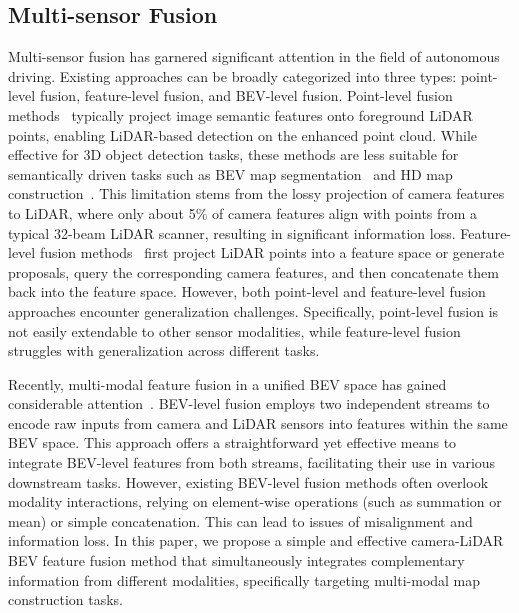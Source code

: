 \subsection{Multi-sensor Fusion}
Multi-sensor fusion has garnered significant attention in the field of autonomous driving. Existing approaches can be broadly categorized into three types: point-level fusion, feature-level fusion, and BEV-level fusion.
Point-level fusion methods~\cite{21cvprpointaug,2020cvprpointpainting,21itscfusionpainting,22ijcaiautoalign,21nipsmultimodal} typically project image semantic features onto foreground LiDAR points, enabling LiDAR-based detection on the enhanced point cloud. While effective for 3D object detection tasks, these methods are less suitable for semantically driven tasks such as BEV map segmentation~\cite{liu2023bevfusion,bevfusion22mips,zhou2022cross,xie2022m} and HD map construction~\cite{li2022hdmapnet,liu2023vectormapnet,MapTR}. This limitation stems from the lossy projection of camera features to LiDAR, where only about 5\% of camera features align with points from a typical 32-beam LiDAR scanner, resulting in significant information loss.
Feature-level fusion methods~\cite{22cvprfocal,18eccvdeepcontinuous} first project LiDAR points into a feature space or generate proposals, query the corresponding camera features, and then concatenate them back into the feature space. However, both point-level and feature-level fusion approaches encounter generalization challenges. Specifically, point-level fusion is not easily extendable to other sensor modalities, while feature-level fusion struggles with generalization across different tasks.



Recently, multi-modal feature fusion in a unified BEV space has gained considerable attention~\cite{MapTR,liu2023vectormapnet,li2022hdmapnet,liu2023bevfusion,bevfusion22mips}. BEV-level fusion employs two independent streams to encode raw inputs from camera and LiDAR sensors into features within the same BEV space. This approach offers a straightforward yet effective means to integrate BEV-level features from both streams, facilitating their use in various downstream tasks.
However, existing BEV-level fusion methods often overlook modality interactions, relying on element-wise operations (such as summation or mean) or simple concatenation. This can lead to issues of misalignment and information loss. In this paper, we propose a simple and effective camera-LiDAR BEV feature fusion method that simultaneously integrates complementary information from different modalities, specifically targeting multi-modal map construction tasks.





